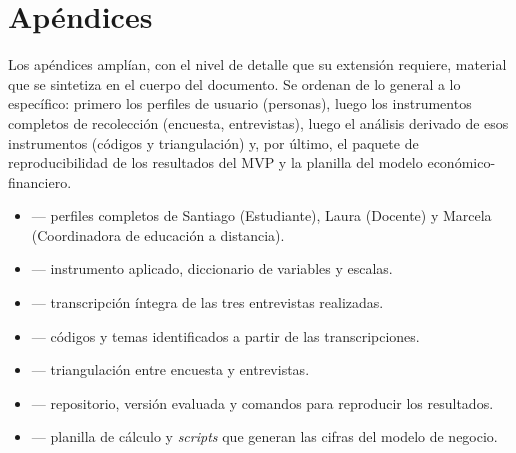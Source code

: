 \chapter*{Apéndices}

Los apéndices amplían, con el nivel de detalle que su extensión requiere, material que se sintetiza en el cuerpo del documento. Se ordenan de lo general a lo específico: primero los perfiles de usuario (personas), luego los instrumentos completos de recolección (encuesta, entrevistas), luego el análisis derivado de esos instrumentos (códigos y triangulación) y, por último, el paquete de reproducibilidad de los resultados del MVP y la planilla del modelo económico-financiero.

\begin{itemize}
    \item[\textbf{A}]  --- perfiles completos de Santiago (Estudiante), Laura (Docente) y Marcela (Coordinadora de educación a distancia).
    \item[\textbf{B}]  --- instrumento aplicado, diccionario de variables y escalas.
    \item[\textbf{C}]  --- transcripción íntegra de las tres entrevistas realizadas.
    \item[\textbf{D}]  --- códigos y temas identificados a partir de las transcripciones.
    \item[\textbf{E}]  --- triangulación entre encuesta y entrevistas.
    \item[\textbf{F}]  --- repositorio, versión evaluada y comandos para reproducir los resultados.
    \item[\textbf{G}]  --- planilla de cálculo y \textit{scripts} que generan las cifras del modelo de negocio.
\end{itemize}
